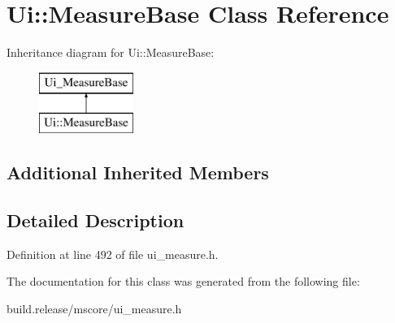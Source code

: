 \hypertarget{class_ui_1_1_measure_base}{}\section{Ui\+:\+:Measure\+Base Class Reference}
\label{class_ui_1_1_measure_base}
Inheritance diagram for Ui\+:\+:Measure\+Base\+:\begin{figure}[H]
\begin{center}
\leavevmode
\includegraphics[height=2.000000cm]{class_ui_1_1_measure_base}
\end{center}
\end{figure}
\subsection*{Additional Inherited Members}


\subsection{Detailed Description}


Definition at line 492 of file ui\+\_\+measure.\+h.



The documentation for this class was generated from the following file\+:\begin{DoxyCompactItemize}
\item 
build.\+release/mscore/ui\+\_\+measure.\+h\end{DoxyCompactItemize}
